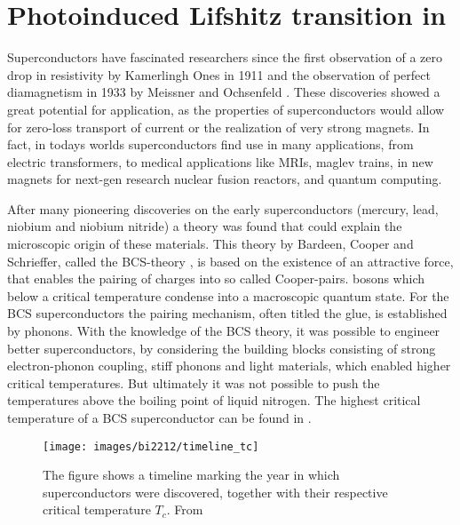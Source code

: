 \chapter{Photoinduced Lifshitz transition in }
\label{ch:bi2212}

Superconductors have fascinated researchers since the first observation of a zero drop in resistivity by Kamerlingh Ones in 1911 \cite{van_delft_discovery_2010} and the observation of perfect diamagnetism in 1933 by Meissner and Ochsenfeld \cite{meissner_neuer_1933}.
These discoveries showed a great potential for application, as the properties of superconductors would allow for zero-loss transport of current or the realization of very strong magnets.
In fact, in todays worlds superconductors find use in many applications, from electric transformers, to medical applications like MRIs, maglev trains, in new magnets for next-gen research nuclear fusion reactors, and quantum computing.

After many pioneering discoveries on the early superconductors (mercury, lead, niobium and niobium nitride) a theory was found that could explain the microscopic origin of these materials.
This theory by Bardeen, Cooper and Schrieffer, called the BCS-theory \cite{bardeen_theory_1957}, is based on the existence of an attractive force, that enables the pairing of charges into so called Cooper-pairs. bosons which below a critical temperature condense into a macroscopic quantum state.
For the BCS superconductors the pairing mechanism, often titled the glue, is established by phonons.
With the knowledge of the BCS theory, it was possible to engineer better superconductors, by considering the building blocks consisting of strong electron-phonon coupling, stiff phonons and light materials, which enabled higher critical temperatures.
But ultimately it was not possible to push the temperatures above the boiling point of liquid nitrogen.
The highest critical temperature of a BCS superconductor can be found in  \cite{nagamatsu_superconductivity_2001}.

\begin{figure}
	\centering
	\texttt{[image: images/bi2212/timeline\_tc]}
	\caption{The figure shows a timeline marking the year in which superconductors were discovered, together with their respective critical temperature $T_c$. From \cite{pjray_english_2015}}
	\label{fig:timeline}
\end{figure}

